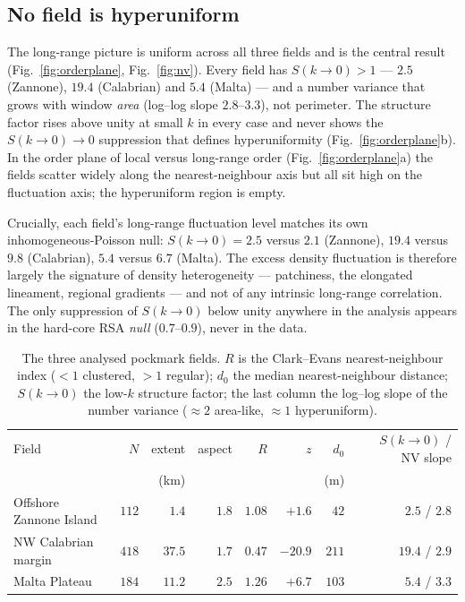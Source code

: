 \documentclass[11pt]{article}
\begin{document}
\subsection{No field is hyperuniform}

The long-range picture is uniform across all three fields and is the central
result (Fig.~\ref{fig:orderplane}, Fig.~\ref{fig:nv}). Every field has
$S(k\!\to\!0)>1$ --- $2.5$ (Zannone), $19.4$ (Calabrian) and $5.4$ (Malta) ---
and a number variance that grows with window \emph{area} (log--log slope
$2.8$--$3.3$), not perimeter. The structure factor rises above unity at small
$k$ in every case and never shows the $S(k\!\to\!0)\to0$ suppression that defines
hyperuniformity (Fig.~\ref{fig:orderplane}b). In the order plane of local versus
long-range order (Fig.~\ref{fig:orderplane}a) the fields scatter widely along the
nearest-neighbour axis but all sit high on the fluctuation axis; the hyperuniform
region is empty.

Crucially, each field's long-range fluctuation level matches its own
inhomogeneous-Poisson null: $S(k\!\to\!0)=2.5$ versus $2.1$ (Zannone), $19.4$
versus $9.8$ (Calabrian), $5.4$ versus $6.7$ (Malta). The excess density
fluctuation is therefore largely the signature of density heterogeneity ---
patchiness, the elongated lineament, regional gradients --- and not of any
intrinsic long-range correlation. The only suppression of $S(k\!\to\!0)$ below
unity anywhere in the analysis appears in the hard-core RSA \emph{null}
($0.7$--$0.9$), never in the data.

\begin{table}[t]
\centering
\caption{The three analysed pockmark fields. $R$ is the Clark--Evans
nearest-neighbour index ($<1$ clustered, $>1$ regular); $d_0$ the median
nearest-neighbour distance; $S(k\!\to\!0)$ the low-$k$ structure factor; the last
column the log--log slope of the number variance ($\approx2$ area-like,
$\approx1$ hyperuniform).}
\label{tab:summary}
\begin{tabular}{lrrrrrrr}
\toprule
Field & $N$ & extent & aspect & $R$ & $z$ & $d_0$ & $S(k\!\to\!0)$ / NV slope\\
 & & (km) & & & & (m) & \\
\midrule
Offshore Zannone Island      & $112$ & $1.4$  & $1.8$ & $1.08$ & $+1.6$  & $42$  & $2.5$ / $2.8$\\
NW Calabrian margin          & $418$ & $37.5$ & $1.7$ & $0.47$ & $-20.9$ & $211$ & $19.4$ / $2.9$\\
Malta Plateau                & $184$ & $11.2$ & $2.5$ & $1.26$ & $+6.7$  & $103$ & $5.4$ / $3.3$\\
\bottomrule
\end{tabular}
\end{table}
\end{document}
